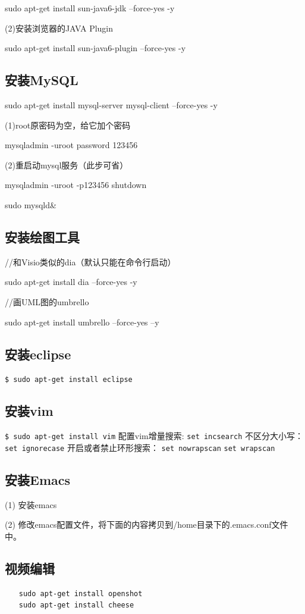sudo apt-get install sun-java6-jdk --force-yes -y

(2)安装浏览器的JAVA Plugin

sudo apt-get install sun-java6-plugin --force-yes -y

\subsection{安装MySQL}
sudo apt-get install mysql-server mysql-client --force-yes -y

(1)root原密码为空，给它加个密码

mysqladmin -uroot password 123456

(2)重启动mysql服务（此步可省）

mysqladmin -uroot -p123456 shutdown

sudo mysqld\&

\subsection{安装绘图工具}
//和Visio类似的dia（默认只能在命令行启动）

sudo apt-get install dia --force-yes -y

//画UML图的umbrello


sudo apt-get install umbrello --force-yes –y

\subsection{安装eclipse}
\verb"$ sudo apt-get install eclipse"

\subsection{安装vim}
\verb"$ sudo apt-get install vim"
配置vim增量搜索:
\verb"set incsearch"
不区分大小写：
\verb"set ignorecase"
开启或者禁止环形搜索：
\verb"set nowrapscan"
\verb"set wrapscan"

\subsection{安装Emacs}
(1) 安装emacs

(2) 修改emacs配置文件，将下面的内容拷贝到/home目录下的.emacs.conf文件中。

\subsection{视频编辑}
\begin{verbatim}
　　sudo apt-get install openshot
　　sudo apt-get install cheese
\end{verbatim}

